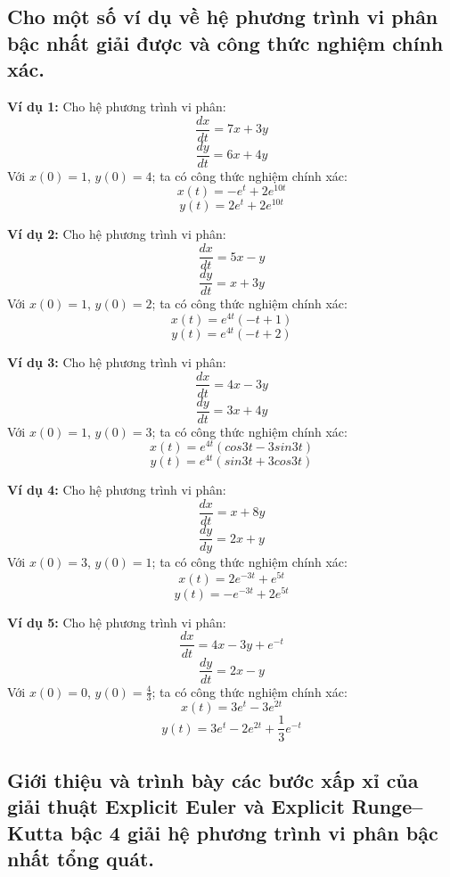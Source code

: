 \documentclass[a4paper]{article}
\begin{document}
\subsection{Cho một số ví dụ về hệ phương trình vi phân bậc nhất giải được và công thức nghiệm chính xác.}
    \begin{flushleft}
        \textbf{Ví dụ 1: }
        Cho hệ phương trình vi phân: 
            \[\frac{dx}{dt} = 7x + 3y\]
            \[\frac{dy}{dt} = 6x + 4y\]
        Với $x(0) = 1$, $y(0) = 4$; ta có công thức nghiệm chính xác:
            \[x(t) = -e^t + 2e^{10t}\]
            \[y(t) = 2e^t + 2e^{10t}\]
	    
        \textbf{Ví dụ 2: }
        Cho hệ phương trình vi phân: \\
            \[\frac{dx}{dt} = 5x - y\]
            \[\frac{dy}{dt} = x + 3y\]
        Với $x(0) = 1$, $y(0) = 2$; ta có công thức nghiệm chính xác:
            \[x(t) = e^{4t}(-t + 1)\]
            \[y(t) = e^{4t}(-t + 2)\]

        \textbf{Ví dụ 3: }
        Cho hệ phương trình vi phân:
            \[\frac{dx}{dt} = 4x - 3y\]
            \[\frac{dy}{dt} = 3x + 4y\]
        Với $x(0) = 1$, $y(0) = 3$; ta có công thức nghiệm chính xác:
            \[x(t) = e^{4t}(cos3t - 3sin3t)\]
            \[y(t) = e^{4t}(sin3t + 3cos3t)\]
        
        \textbf{Ví dụ 4: }
        Cho hệ phương trình vi phân:
            \[\frac{dx}{dt} = x + 8y\]
            \[\frac{dy}{dy} = 2x + y\]
        Với $x(0) = 3$, $y(0) = 1$; ta có công thức nghiệm chính xác:
            \[x(t) = 2e^{-3t} + e^{5t}\]
            \[y(t) = -e^{-3t} + 2e^{5t}\]
       
        \textbf{Ví dụ 5: }
        Cho hệ phương trình vi phân: 
            \[\frac{dx}{dt} = 4x - 3y + e^{-t}\]
            \[\frac{dy}{dt} = 2x - y\]
        Với $x(0) = 0$, $y(0) = \frac{4}{3}$; ta có công thức nghiệm chính xác:
            \[x(t) = 3e^t - 3e^{2t}\]
            \[y(t) = 3e^t - 2e^{2t} + \frac{1}{3}e^{-t}\]
    \end{flushleft}
    
\subsection{Giới thiệu và trình bày các bước xấp xỉ của giải thuật Explicit Euler và Explicit Runge–Kutta bậc 4 giải hệ phương trình vi phân bậc nhất tổng quát.}
\end{document}
